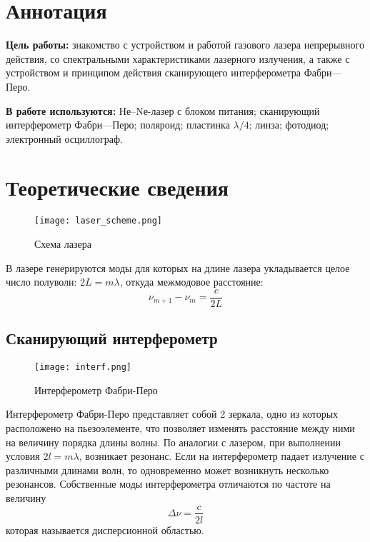






\section{Аннотация}

\textbf{Цель работы: } знакомство с устройством и работой газового лазера непрерывного действия, со спектральными характеристиками лазерного излучения, а также с устройством и принципом действия сканирующего интерферометра Фабри—Перо.

\textbf{В работе используются: } Не–Nе-лазер с блоком питания; сканирующий интерферометр Фабри—Перо; поляроид; пластинка $\lambda/4$; линза; фотодиод; электронный осциллограф.

\section{Теоретические сведения}

\begin{figure}[H]
	\centering
	\texttt{[image: laser\_scheme.png]}
	\caption{Схема лазера}
\end{figure}

В лазере генерируются моды для которых на длине лазера укладывается целое число полуволн: $2L = m\lambda$, откуда межмодовое расстояние:
\begin{equation}
    \label{equ:betweenMode}
	\nu_{m+1} - \nu_{m} = \frac{c}{2L}
\end{equation}

\subsection{Сканирующий интерферометр}

\begin{figure}[H]
	\centering
	\texttt{[image: interf.png]}
	\caption{Интерферометр Фабри-Перо}
\end{figure}

Интерферометр Фабри-Перо представляет собой 2 зеркала, одно из которых расположено на пьезоэлементе, что позволяет изменять расстояние между ними на величину порядка длины волны. По аналогии с лазером, при выполнении условия $2l = m\lambda$, возникает резонанс.
Если на интерферометр падает излучение с различными длинами волн, то одновременно может возникнуть несколько резонансов. Собственные моды интерферометра отличаются по частоте на величину
\begin{equation}
	\label{equ:dispObl}
	\Delta\nu = \frac{c}{2l}
\end{equation}
которая называется дисперсионной областью. 

